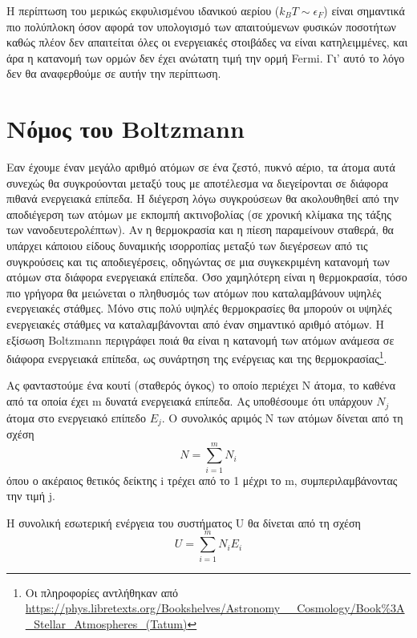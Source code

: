 Η περίπτωση του μερικώς εκφυλισμένου ιδανικού αερίου ($k_B T \sim \epsilon_F$) είναι σημαντικά πιο πολύπλοκη όσον αφορά τον υπολογισμό των απαιτούμενων φυσικών ποσοτήτων καθώς πλέον δεν απαιτείται όλες οι ενεργειακές στοιβάδες να είναι κατηλειμμένες, και άρα η κατανομή των ορμών δεν έχει ανώτατη τιμή την ορμή Fermi. Γι' αυτό το λόγο δεν θα αναφερθούμε σε αυτήν την περίπτωση.




\section{Νόμος του Boltzmann}
Εαν έχουμε έναν μεγάλο αριθμό ατόμων σε ένα ζεστό, πυκνό αέριο, τα άτομα αυτά συνεχώς θα συγκρούονται μεταξύ τους με αποτέλεσμα να διεγείρονται σε διάφορα πιθανά ενεργειακά επίπεδα. Η διέγερση λόγω συγκρούσεων θα ακολουθηθεί από την αποδιέγερση των ατόμων με εκπομπή ακτινοβολίας (σε χρονική κλίμακα της τάξης των νανοδευτερολέπτων). Αν η θερμοκρασία και η πίεση παραμείνουν σταθερά, θα υπάρχει κάποιου είδους δυναμικής ισορροπίας μεταξύ των διεγέρσεων από τις συγκρούσεις και τις αποδιεγέρσεις, οδηγώντας σε μια συγκεκριμένη κατανομή των ατόμων στα διάφορα ενεργειακά επίπεδα. Όσο χαμηλότερη είναι η θερμοκρασία, τόσο πιο γρήγορα θα μειώνεται ο πληθυσμός των ατόμων που καταλαμβάνουν υψηλές ενεργειακές στάθμες. Μόνο στις πολύ υψηλές θερμοκρασίες θα μπορούν οι υψηλές ενεργειακές στάθμες να καταλαμβάνονται από έναν σημαντικό αριθμό ατόμων. Η εξίσωση Boltzmann περιγράφει ποιά θα είναι η κατανομή των ατόμων ανάμεσα σε διάφορα ενεργειακά επίπεδα, ως συνάρτηση της ενέργειας και της θερμοκρασίας\footnote{Οι πληροφορίες αντλήθηκαν από \url{https://phys.libretexts.org/Bookshelves/Astronomy__Cosmology/Book\%3A_Stellar_Atmospheres_(Tatum)}}. 

Ας φανταστούμε ένα κουτί (σταθερός όγκος) το οποίο περιέχει N άτομα, το καθένα από τα οποία έχει m δυνατά ενεργειακά επίπεδα. Ας υποθέσουμε ότι υπάρχουν $ N_j$ άτομα στο ενεργειακό επίπεδο $ E_j$. Ο συνολικός αριμός N των ατόμων δίνεται από τη σχέση
\begin{equation}
    \label{eq:apx:total_number_of_atoms}
     N = \sum_{i=1}^{m} N_i
\end{equation}
όπου ο ακέραιος θετικός δείκτης i τρέχει από το 1 μέχρι το m, συμπεριλαμβάνοντας την τιμή j.

Η συνολική εσωτερική ενέργεια του συστήματος U θα δίνεται από τη σχέση
\begin{equation}
    \label{eq:apx:internal_energy}
     U = \sum_{i=1}^{m} N_i E_i
\end{equation}

